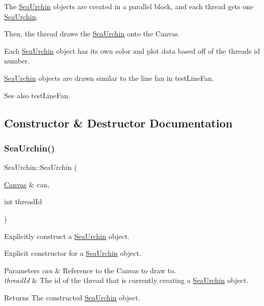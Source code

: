 The \hyperlink{class_sea_urchin}{Sea\+Urchin} objects are created in a parallel block, and each thread gets one \hyperlink{class_sea_urchin}{Sea\+Urchin}.

Then, the thread draws the \hyperlink{class_sea_urchin}{Sea\+Urchin} onto the Canvas.

Each \hyperlink{class_sea_urchin}{Sea\+Urchin} object has its own color and plot data based off of the thread\textquotesingle{}s id number.

\hyperlink{class_sea_urchin}{Sea\+Urchin} objects are drawn similar to the line fan in test\+Line\+Fan. \begin{DoxySeeAlso}{See also}
test\+Line\+Fan. 
\end{DoxySeeAlso}


\subsection{Constructor \& Destructor Documentation}
\mbox{\label{class_sea_urchin_a29fac511aa0967424cbfb0729ce06f2c}} 
\subsubsection{\texorpdfstring{Sea\+Urchin()}{SeaUrchin()}}
{\footnotesize\ttfamily Sea\+Urchin\+::\+Sea\+Urchin (\begin{DoxyParamCaption}\item[{\hyperlink{classtsgl_1_1_canvas}{Canvas} \&}]{can,  }\item[{int}]{thread\+Id }\end{DoxyParamCaption})}



Explicitly construct a \hyperlink{class_sea_urchin}{Sea\+Urchin} object. 

Explicit constructor for a \hyperlink{class_sea_urchin}{Sea\+Urchin} object. 
\begin{DoxyParams}{Parameters}
{\em can} & Reference to the Canvas to draw to. \\
\hline
{\em thread\+Id} & The id of the thread that is currently creating a \hyperlink{class_sea_urchin}{Sea\+Urchin} object. \\
\hline
\end{DoxyParams}
\begin{DoxyReturn}{Returns}
The constructed \hyperlink{class_sea_urchin}{Sea\+Urchin} object. 
\end{DoxyReturn}
\mbox{\label{class_sea_urchin_a30d580184797c2cf2b6f6eac21bc3b07}} 
